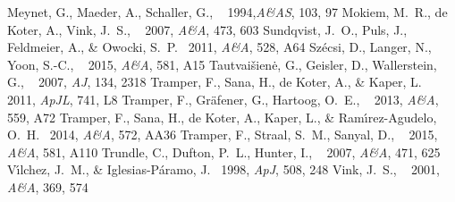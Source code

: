 \documentclass{iau}
\begin{document}
\begin{thebibliography}{}
      {Meynet, G., Maeder, A., Schaller, G., \etal\ } 1994,\textit{A\&AS}, 103, 97 
     {Mokiem, M.~R., de Koter, A., Vink, J.~S., \etal\ } 2007, \textit{A\&A}, 473, 603
  {Sundqvist, J.~O., Puls, J., Feldmeier, A., \& Owocki, S.~P.\ } 2011, \textit{A\&A}, 528, A64
 {Sz{\'e}csi, D., Langer, N., Yoon, S.-C., \etal\ } 2015, \textit{A\&A}, 581, A15
 {Tautvai{\v s}ien{\.e}, G., Geisler, D., Wallerstein, G., \etal\ } 2007, \textit{AJ}, 134, 2318 
    {Tramper, F., Sana, H., de Koter, A., \& Kaper, L.\ } 2011, \textit{ApJL}, 741, L8
     {Tramper, F., Gr{\"a}fener, G., Hartoog, O.~E., \etal\ } 2013, \textit{A\&A}, 559, A72 
     {Tramper, F., Sana, H., de Koter, A., Kaper, L., \& Ram{\'{\i}}rez-Agudelo, O.~H.\ } 2014, \textit{A\&A}, 572, AA36 
    {Tramper, F., Straal, S.~M., Sanyal, D., \etal\ } 2015, \textit{A\&A}, 581, A110
    {Trundle, C., Dufton, P.~L., Hunter, I., \etal\ } 2007, \textit{A\&A}, 471, 625
 {V{\'{\i}}lchez, J.~M., \& Iglesias-P{\'a}ramo, J.\ } 1998, \textit{ApJ}, 508, 248
        {Vink, J.~S., \etal\ } 2001, \textit{A\&A}, 369, 574 

\end{thebibliography}

\begin{discussion}



\end{discussion}
\end{document}
